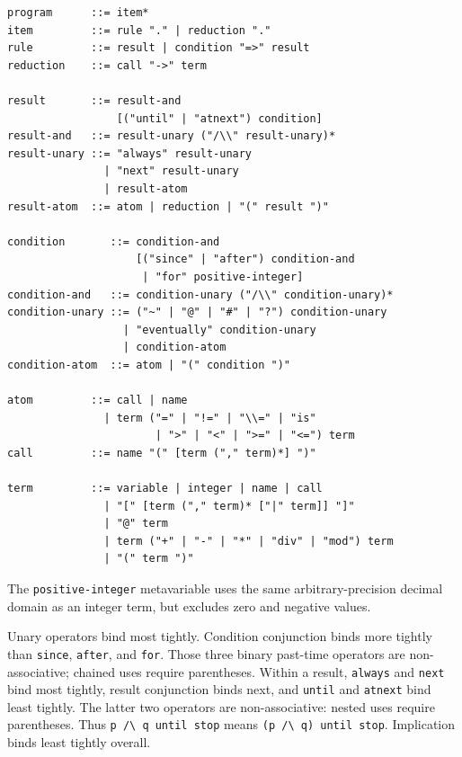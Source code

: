 \documentclass[11pt]{article}
\begin{document}
\begin{verbatim}
program      ::= item*
item         ::= rule "." | reduction "."
rule         ::= result | condition "=>" result
reduction    ::= call "->" term

result       ::= result-and
                 [("until" | "atnext") condition]
result-and   ::= result-unary ("/\\" result-unary)*
result-unary ::= "always" result-unary
               | "next" result-unary
               | result-atom
result-atom  ::= atom | reduction | "(" result ")"

condition       ::= condition-and
                    [("since" | "after") condition-and
                     | "for" positive-integer]
condition-and   ::= condition-unary ("/\\" condition-unary)*
condition-unary ::= ("~" | "@" | "#" | "?") condition-unary
                  | "eventually" condition-unary
                  | condition-atom
condition-atom  ::= atom | "(" condition ")"

atom         ::= call | name
               | term ("=" | "!=" | "\\=" | "is"
                       | ">" | "<" | ">=" | "<=") term
call         ::= name "(" [term ("," term)*] ")"

term         ::= variable | integer | name | call
               | "[" [term ("," term)* ["|" term]] "]"
               | "@" term
               | term ("+" | "-" | "*" | "div" | "mod") term
               | "(" term ")"
\end{verbatim}

The \texttt{positive-integer} metavariable uses the same arbitrary-precision
decimal domain as an integer term, but excludes zero and negative values.

Unary operators bind most tightly.  Condition conjunction binds more tightly
than \verb|since|, \verb|after|, and \verb|for|.  Those three binary past-time
operators are non-associative; chained uses require parentheses.  Within a result,
\verb|always| and \verb|next| bind most tightly, result conjunction binds next,
and \verb|until| and \verb|atnext| bind least tightly.  The latter two operators
are non-associative: nested uses require parentheses.  Thus
\verb|p /\ q until stop| means \verb|(p /\ q) until stop|.  Implication binds
least tightly overall.
\end{document}
